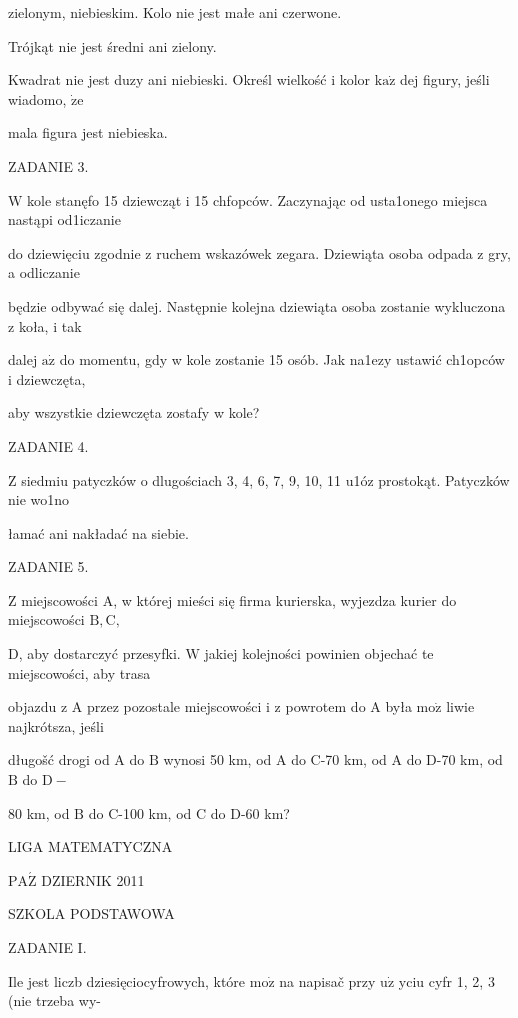 \documentclass[a4paper,12pt]{article}
\begin{document}
zielonym, niebieskim. Kolo nie jest małe ani czerwone.

Trójkąt nie jest średni ani zielony.

Kwadrat nie jest duzy ani niebieski. Określ wielkość i kolor $\mathrm{k}\mathrm{a}\dot{\mathrm{z}}$ dej figury, jeśli wiadomo, $\dot{\mathrm{z}}\mathrm{e}$

mala figura jest niebieska.

ZADANIE 3.

$\mathrm{W}$ kole stanęfo 15 dziewcząt i 15 chfopców. Zaczynając od usta1onego miejsca nastąpi od1iczanie

do dziewięciu zgodnie z ruchem wskazówek zegara. Dziewiąta osoba odpada z gry, a odliczanie

będzie odbywać się dalej. Następnie kolejna dziewiąta osoba zostanie wykluczona z koła, i tak

dalej $\mathrm{a}\dot{\mathrm{z}}$ do momentu, gdy w kole zostanie 15 osób. Jak na1ezy ustawić ch1opców i dziewczęta,

aby wszystkie dziewczęta zostafy w kole?

ZADANIE 4.

Z siedmiu patyczków o dlugościach 3, 4, 6, 7, 9, 10, 11 u1óz prostokąt. Patyczków nie wo1no

łamać ani nakładać na siebie.

ZADANIE 5.

$\mathrm{Z}$ miejscowości $\mathrm{A}$, w której mieści się firma kurierska, wyjezdza kurier do miejscowości $\mathrm{B}, \mathrm{C},$

$\mathrm{D}$, aby dostarczyć przesyfki. $\mathrm{W}$ jakiej kolejności powinien objechać te miejscowości, aby trasa

objazdu z A przez pozostale miejscowości i z powrotem do A była $\mathrm{m}\mathrm{o}\dot{\mathrm{z}}$ liwie najkrótsza, jeśli

długošć drogi od A do $\mathrm{B}$ wynosi 50 km, od A do C-70 km, od A do D-70 km, od $\mathrm{B}$ do $\mathrm{D}-$

$80$ km, od $\mathrm{B}$ do C-100 km, od $\mathrm{C}$ do D-60 km?






LIGA MATEMATYCZNA

$\mathrm{P}\mathrm{A}\acute{\mathrm{Z}}$ DZIERNIK 2011

SZKOLA PODSTAWOWA

ZADANIE I.

Ile jest liczb dziesięciocyfrowych, które $\mathrm{m}\mathrm{o}\dot{\mathrm{z}}$ na napisač przy $\mathrm{u}\dot{\mathrm{z}}$ yciu cyfr 1, 2, 3 (nie trzeba wy-
\end{document}
